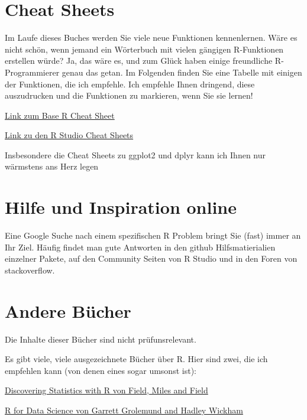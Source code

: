 \documentclass[
]{book}
\begin{document}
\hypertarget{cheat-sheets}{%
\section{Cheat Sheets}\label{cheat-sheets}}

Im Laufe dieses Buches werden Sie viele neue Funktionen kennenlernen. Wäre es nicht schön, wenn jemand ein Wörterbuch mit vielen gängigen R-Funktionen erstellen würde? Ja, das wäre es, und zum Glück haben einige freundliche R-Programmierer genau das getan. Im Folgenden finden Sie eine Tabelle mit einigen der Funktionen, die ich empfehle. Ich empfehle Ihnen dringend, diese auszudrucken und die Funktionen zu markieren, wenn Sie sie lernen!

\href{https://cran.r-project.org/doc/contrib/Short-refcard.pdf}{Link zum Base R Cheat Sheet}

\href{https://www.rstudio.com/resources/cheatsheets/}{Link zu den R Studio Cheat Sheets}

Insbesondere die Cheat Sheets zu ggplot2 und dplyr kann ich Ihnen nur wärmstens ans Herz legen

\hypertarget{hilfe-und-inspiration-online}{%
\section{Hilfe und Inspiration online}\label{hilfe-und-inspiration-online}}

Eine Google Suche nach einem spezifischen R Problem bringt Sie (fast) immer an Ihr Ziel. Häufig findet man gute Antworten in den github Hilfsmatierialien einzelner Pakete, auf den Community Seiten von R Studio und in den Foren von stackoverflow.

\hypertarget{andere-buxfccher}{%
\section{Andere Bücher}\label{andere-buxfccher}}

Die Inhalte dieser Bücher sind nicht prüfunsrelevant.

Es gibt viele, viele ausgezeichnete Bücher über R. Hier sind zwei, die ich empfehlen kann (von denen eines sogar umsonst ist):

\href{https://www.amazon.com/Discovering-Statistics-Using-Andy-Field/dp/1446200469/ref=sr_1_2?ie=UTF8\&qid=1487759316\&sr=8-2\&keywords=statistics+with+r}{Discovering Statistics with R von Field, Miles and Field}

\href{http://r4ds.had.co.nz}{R for Data Science von Garrett Grolemund and Hadley Wickham}
\end{document}
